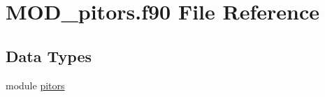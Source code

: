 \hypertarget{MOD__pitors_8f90}{\section{M\-O\-D\-\_\-pitors.\-f90 File Reference}
\label{MOD__pitors_8f90}
}
\subsection*{Data Types}
\begin{DoxyCompactItemize}
\item 
module \hyperlink{classpitors}{pitors}
\end{DoxyCompactItemize}
